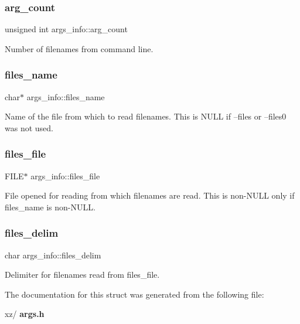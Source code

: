 \subsubsection{arg\+\_\+count}
{\footnotesize\ttfamily unsigned int args\+\_\+info\+::arg\+\_\+count}



Number of filenames from command line. 

\mbox{\label{structargs__info_a4f3579733d0f2618b53bc4f5e7d16026}} 
\subsubsection{files\+\_\+name}
{\footnotesize\ttfamily char$\ast$ args\+\_\+info\+::files\+\_\+name}

Name of the file from which to read filenames. This is N\+U\+LL if --files or --files0 was not used. \mbox{\label{structargs__info_a1fb4e81e69ac5217c1b89c17e7bdb24e}} 
\subsubsection{files\+\_\+file}
{\footnotesize\ttfamily F\+I\+LE$\ast$ args\+\_\+info\+::files\+\_\+file}

File opened for reading from which filenames are read. This is non-\/\+N\+U\+LL only if files\+\_\+name is non-\/\+N\+U\+LL. \mbox{\label{structargs__info_aa9a2d68abe3e224bcc970f5b3d9184e6}} 
\subsubsection{files\+\_\+delim}
{\footnotesize\ttfamily char args\+\_\+info\+::files\+\_\+delim}



Delimiter for filenames read from files\+\_\+file. 



The documentation for this struct was generated from the following file\+:\begin{DoxyCompactItemize}
\item 
xz/\textbf{ args.\+h}\end{DoxyCompactItemize}
